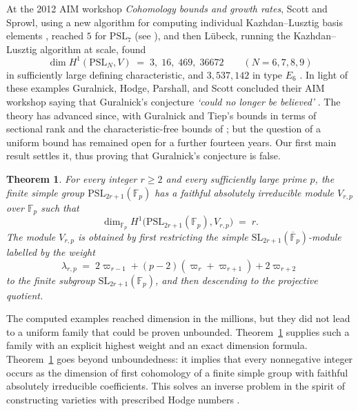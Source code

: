 \documentclass[11pt,a4paper,reqno]{amsart}
\numberwithin{equation}{section}
\newtheorem{maintheorem}{Theorem}
\theoremstyle{definition}
\theoremstyle{remark}
\theoremstyle{plain}
\begin{document}
At the 2012 AIM workshop \emph{Cohomology bounds and growth rates}, Scott
and Sprowl, using a new algorithm for computing individual
Kazhdan--Lusztig basis elements \cite{ScottSprowl}, reached $5$ for
$\mathrm{PSL}_7$ (see \cite[\S4]{Luebeck}), and then L\"ubeck, running
the Kazhdan--Lusztig algorithm at scale, found\[
\dim H^1(\mathrm{PSL}_N,V)\;=\;3,\;16,\;469,\;36672
\qquad (N=6,7,8,9)
\]
in sufficiently large defining characteristic, and $3{,}537{,}142$ in
type $E_6$ \cite[\S4.1 and Theorem~4.7]{Luebeck}.
%
  In light of these examples Guralnick, Hodge, Parshall, and  Scott concluded their AIM workshop saying that Guralnick's conjecture {\em `could no longer be believed'} \cite{GHPS}.
The theory has advanced since, with Guralnick and Tiep's bounds in terms
of sectional rank \cite{GTSectional,GTSectionalII} and the
characteristic-free bounds of \cite{BBDNPPW,BNPPSS15}; but the question
of a uniform bound has remained open for a further fourteen years. Our
first main result settles it, thus proving that Guralnick's conjecture is false. 
 
\begin{maintheorem}
\label{thm:A}
\label{thm:guralnick}
\label{thm:guralnick-counterexample}
\label{cor:unbounded-first-cohomology}
For every integer $r\ge2$ and every sufficiently large prime $p$,
the finite
simple group $\mathrm{PSL}_{2r+1}(\mathbb F_p)$
has a faithful absolutely
irreducible module $V_{r,p}$ over $\mathbb F_p$ such that
\begin{equation}\label{eq:unbounded-first-cohomology}
\dim_{\mathbb F_p}
H^1\big(\mathrm{PSL}_{2r+1}(\mathbb F_p),V_{r,p}\big)\;=\;r.
\end{equation}
%
The module $V_{r,p}$ is obtained by 
first restricting    the simple  
$\mathrm{SL}_{2r+1}(\overline{\mathbb F}_p)$-module labelled by the weight
\[
\lambda_{r,p}\;=\;
2\varpi_{r-1}+(p-2)(\varpi_r+\varpi_{r+1})+2\varpi_{r+2}
\]
to the finite subgroup $\mathrm{SL}_{2r+1}(\mathbb F_p)$,
 and then descending to the projective quotient. 
 \end{maintheorem}
 
The computed examples reached dimension in the millions, but they did not lead to a  
uniform family that   could be proven unbounded. 
Theorem~\ref{thm:A} supplies such a family with
an explicit highest weight and an exact dimension formula.
Theorem~\ref{thm:A} goes beyond unboundedness:
 it implies that every nonnegative integer
occurs as the dimension of first cohomology of a finite simple
group with faithful absolutely irreducible coefficients.
This solves an inverse problem in the spirit of constructing
varieties with prescribed Hodge numbers
\cite[Theorem~1]{Schreieder2015}.
\end{document}

